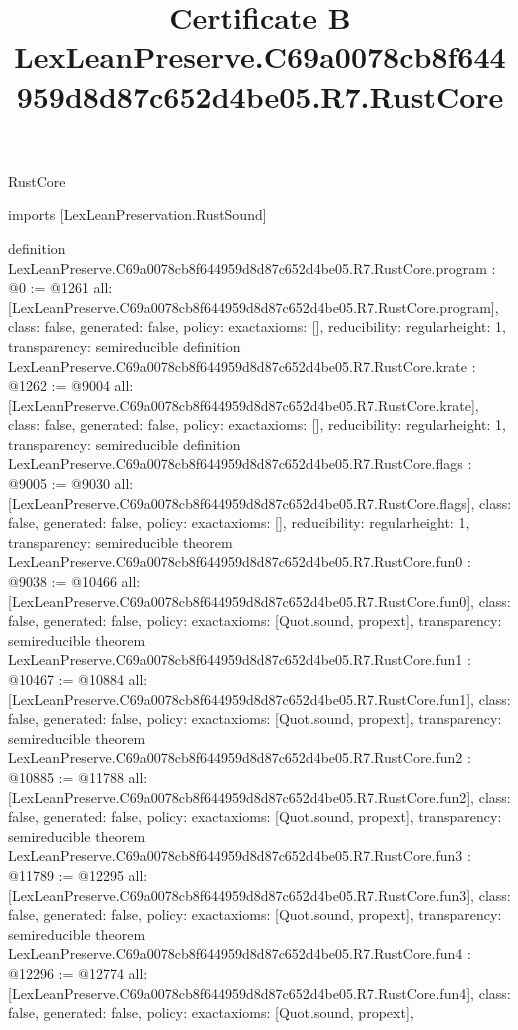 \begin{lexlean}{RustCore}
\title{Certificate B LexLeanPreserve.C69a0078cb8f644959d8d87c652d4be05.R7.RustCore}
\begin{coremodule}
imports [LexLeanPreservation.RustSound]

definition LexLeanPreserve.C69a0078cb8f644959d8d87c652d4be05.R7.RustCore.program : @0 := @1261 {
  all: [LexLeanPreserve.C69a0078cb8f644959d8d87c652d4be05.R7.RustCore.program],
  class: false,
  generated: false,
  policy: exact{axioms: []},
  reducibility: regular{height: 1},
  transparency: semireducible
}
definition LexLeanPreserve.C69a0078cb8f644959d8d87c652d4be05.R7.RustCore.krate : @1262 := @9004 {
  all: [LexLeanPreserve.C69a0078cb8f644959d8d87c652d4be05.R7.RustCore.krate],
  class: false,
  generated: false,
  policy: exact{axioms: []},
  reducibility: regular{height: 1},
  transparency: semireducible
}
definition LexLeanPreserve.C69a0078cb8f644959d8d87c652d4be05.R7.RustCore.flags : @9005 := @9030 {
  all: [LexLeanPreserve.C69a0078cb8f644959d8d87c652d4be05.R7.RustCore.flags],
  class: false,
  generated: false,
  policy: exact{axioms: []},
  reducibility: regular{height: 1},
  transparency: semireducible
}
theorem LexLeanPreserve.C69a0078cb8f644959d8d87c652d4be05.R7.RustCore.fun0 : @9038 := @10466 {
  all: [LexLeanPreserve.C69a0078cb8f644959d8d87c652d4be05.R7.RustCore.fun0],
  class: false,
  generated: false,
  policy: exact{axioms: [Quot.sound, propext]},
  transparency: semireducible
}
theorem LexLeanPreserve.C69a0078cb8f644959d8d87c652d4be05.R7.RustCore.fun1 : @10467 := @10884 {
  all: [LexLeanPreserve.C69a0078cb8f644959d8d87c652d4be05.R7.RustCore.fun1],
  class: false,
  generated: false,
  policy: exact{axioms: [Quot.sound, propext]},
  transparency: semireducible
}
theorem LexLeanPreserve.C69a0078cb8f644959d8d87c652d4be05.R7.RustCore.fun2 : @10885 := @11788 {
  all: [LexLeanPreserve.C69a0078cb8f644959d8d87c652d4be05.R7.RustCore.fun2],
  class: false,
  generated: false,
  policy: exact{axioms: [Quot.sound, propext]},
  transparency: semireducible
}
theorem LexLeanPreserve.C69a0078cb8f644959d8d87c652d4be05.R7.RustCore.fun3 : @11789 := @12295 {
  all: [LexLeanPreserve.C69a0078cb8f644959d8d87c652d4be05.R7.RustCore.fun3],
  class: false,
  generated: false,
  policy: exact{axioms: [Quot.sound, propext]},
  transparency: semireducible
}
theorem LexLeanPreserve.C69a0078cb8f644959d8d87c652d4be05.R7.RustCore.fun4 : @12296 := @12774 {
  all: [LexLeanPreserve.C69a0078cb8f644959d8d87c652d4be05.R7.RustCore.fun4],
  class: false,
  generated: false,
  policy: exact{axioms: [Quot.sound, propext]},
}
\end{coremodule}
\end{lexlean}
